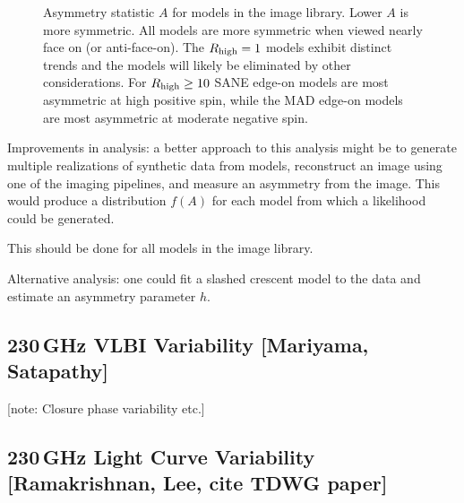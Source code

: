 \documentclass[twocolumn,tighten,dvipsnames,linenumbers]{aastex63}
\newcommand\note[1]{{\color{OliveGreen}[note: #1]}}
\begin{document}
\begin{figure}
  \caption{Asymmetry statistic $A$ for models in the \sgra image library.  Lower $A$ is more symmetric.  All models are more symmetric when viewed nearly face on (or anti-face-on).  The ${R_\mathrm{high}} = 1$ models exhibit distinct trends and the models will likely be eliminated by other considerations.  For ${R_\mathrm{high}} \ge 10$ SANE edge-on models are most asymmetric at high positive spin, while the MAD edge-on models are most asymmetric at moderate negative spin.}
  \label{fig:asymm}
\end{figure}

Improvements in analysis: a better approach to this analysis might be to generate multiple realizations of synthetic data from models, reconstruct an image using one of the imaging pipelines, and measure an asymmetry from the image.  This would produce a distribution $f(A)$ for each model from which a likelihood could be generated.

This should be done for all models in the \sgra image library.

Alternative analysis: one could fit a slashed crescent model to the data and estimate an asymmetry parameter $h$.

\subsection{230\,GHz VLBI Variability
  [Mariyama, Satapathy]}
\label{sec:230variability}

\note{Closure phase variability etc.}


\subsection{230\,GHz Light Curve Variability
  [Ramakrishnan, Lee, cite TDWG paper]}
\label{sec:230lightcurve}
\end{document}

